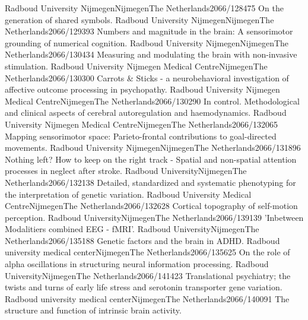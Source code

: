 	{Radboud University Nijmegen}{Nijmegen}{The Netherlands}{2066/128475}
	{On the generation of shared symbols.}
	{Radboud University Nijmegen}{Nijmegen}{The Netherlands}{2066/129393}
	{Numbers and magnitude in the brain: A sensorimotor grounding of numerical cognition.}
	{Radboud University Nijmegen}{Nijmegen}{The Netherlands}{2066/130434}
	{Measuring and modulating the brain with non-invasive stimulation.}
	{Radboud University Nijmegen Medical Centre}{Nijmegen}{The Netherlands}{2066/130300}
	{Carrots \& Sticks - a neurobehavioral investigation of affective outcome processing in psychopathy.}
	{Radboud University Nijmegen Medical Centre}{Nijmegen}{The Netherlands}{2066/130290}
	{In control. Methodological and clinical aspects of cerebral autoregulation and haemodynamics.}
	{Radboud University Nijmegen Medical Centre}{Nijmegen}{The Netherlands}{2066/132065}
	{Mapping sensorimotor space: Parieto-frontal contributions to goal-directed movements.}
	{Radboud University Nijmegen}{Nijmegen}{The Netherlands}{2066/131896}
	{Nothing left? How to keep on the right track - Spatial and non-spatial attention processes in neglect after stroke.}
	{Radboud University}{Nijmegen}{The Netherlands}{2066/132138}
	{Detailed, standardized and systematic phenotyping for the interpretation of genetic variation.}
	{Radboud University Medical Centre}{Nijmegen}{The Netherlands}{2066/132628}
	{Cortical topography of self-motion perception.}
	{Radboud University}{Nijmegen}{The Netherlands}{2066/139139}
	{'Inbetween Modalitiers combined EEG - fMRI'.}
	{Radboud University}{Nijmegen}{The Netherlands}{2066/135188}
	{Genetic factors and the brain in ADHD.}
	{Radboud university medical center}{Nijmegen}{The Netherlands}{2066/135625}
	{On the role of alpha oscillations in structuring neural information processing.}
	{Radboud University}{Nijmegen}{The Netherlands}{2066/141423}
	{Translational psychiatry; the twists and turns of early life stress and serotonin transporter gene variation.}
	{Radboud university medical center}{Nijmegen}{The Netherlands}{2066/140091}
	{The structure and function of intrinsic brain activity.}
